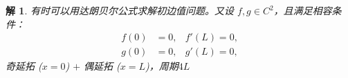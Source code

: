 \documentclass[12pt,a4paper]{article}
\newtheorem*{solution}{解}
\begin{document}
\begin{solution}
	有时可以用达朗贝尔公式求解初边值问题。又设 \(f, g \in C^2\)，且满足相容条件：
\begin{equation}
	\begin{aligned}
		f(0) & = 0, & f'(L)  = 0, \\
		g(0) & =0, & g'(L)  = 0,
	\end{aligned}
\end{equation}
	奇延拓 ($x=0$) $+$ 偶延拓 ($x=L$)，周期$4L$                                                                                                                                                                                                                                                                                                                                                                                                                                                                                                                                                                                                                                                                                                                                                                                                                                                                                                                                                                                                                                                                                                                                                                                                                                                                                                                                                                                                                                                                                                                                                                                                                                                                                                                                                                                                                                                                                                                                                                                                                                                                                                                                                                                                                                                                                                                                                                                                                                                                                                                                                                                                                                                                                                                                                                                                                                                                                                                                                                                  
\end{solution}
\end{document}
